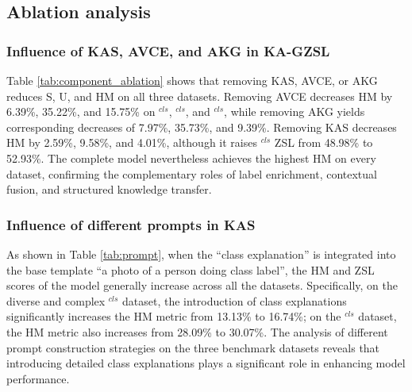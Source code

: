 \documentclass[10pt,journal,twoside]{IEEEtran}
\begin{document}
\subsection{Ablation analysis}
\subsubsection{Influence of KAS, AVCE, and AKG in KA-GZSL}
Table \ref{tab:component_ablation} shows that removing KAS, AVCE, or AKG reduces S, U, and HM on all three datasets. Removing AVCE decreases HM by 6.39\%, 35.22\%, and 15.75\% on $^{\textit{cls}}$, $^{\textit{cls}}$, and $^{\textit{cls}}$, while removing AKG yields corresponding decreases of 7.97\%, 35.73\%, and 9.39\%. Removing KAS decreases HM by 2.59\%, 9.58\%, and 4.01\%, although it raises $^{\textit{cls}}$ ZSL from 48.98\% to 52.93\%. The complete model nevertheless achieves the highest HM on every dataset, confirming the complementary roles of label enrichment, contextual fusion, and structured knowledge transfer.

\subsubsection{Influence of different prompts in KAS}
As shown in Table \ref{tab:prompt}, when the “class explanation” is integrated into the base template “a photo of a person doing {class label}”, the HM and ZSL scores of the model generally increase across all the datasets. Specifically, on the diverse and complex $^{\textit{cls}}$ dataset, the introduction of class explanations significantly increases the HM metric from 13.13\% to 16.74\%; on the $^{\textit{cls}}$ dataset, the HM metric also increases from 28.09\% to 30.07\%. The analysis of different prompt construction strategies on the three benchmark datasets reveals that introducing detailed class explanations plays a significant role in enhancing model performance.
\end{document}
